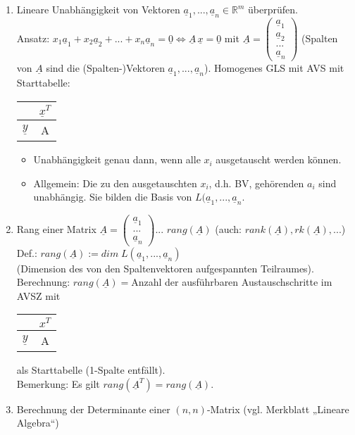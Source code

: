 \begin{enumerate}
\item Lineare Unabhängigkeit von Vektoren $\underline{a}_1,..., \underline{a}_n \in \mathbb{R}^m$ überprüfen.\\
Ansatz: $\boxed{x_1\underline{a}_1+x_2 \underline{a}_2+...+x_n\underline{a}_n=\underline{0}}\Leftrightarrow \boxed{\underline{A}\,\underline{x}=\underline{0}}$ mit $\underline{A}=\begin{pmatrix}
\underline{a}_1\\
\underline{a}_2\\
...\\
\underline{a}_n
\end{pmatrix}$ (Spalten von $\underline{A}$ sind die (Spalten-)Vektoren $\underline{a}_1,...,\underline{a}_n$). Homogenes GLS mit AVS mit Starttabelle: \begin{tabular}{c | c}
& $\underline{x}^T$\\
\hline
$\underline{y}$& A
\end{tabular}
\begin{itemize}
\item Unabhängigkeit genau dann, wenn alle $x_i$ ausgetauscht werden können.
\item Allgemein: Die zu den ausgetauschten $x_i$, d.h. BV, gehörenden $a_i$ sind unabhängig. Sie bilden die Basis von $L(\underline{a}_1,...,\underline{a}_n$.
\end{itemize}
\item Rang einer Matrix $\underline{A}=\begin{pmatrix}
\underline{a}_1\\
...\\
\underline{a}_n
\end{pmatrix}$... $rang(\underline{A})$ (auch: $rank(\underline{A}), rk(\underline{A}),...$)\\
Def.: $\boxed{rang(\underline{A}):=dim\; L(\underline{a}_1,...,\underline{a}_n)}$ \\
(Dimension des von den Spaltenvektoren aufgespannten Teilraumes).\\
Berechnung: $rang(\underline{A})=$Anzahl der ausführbaren Austauschschritte im AVSZ mit \begin{tabular}{r | c}
& $x^T$\\
\hline
$\underline{y}$& A
\end{tabular} als Starttabelle (1-Spalte entfällt).\\
Bemerkung: Es gilt $rang(\underline{A}^T)=rang(\underline{A})$.
\item Berechnung der Determinante einer $(n,n)$-Matrix (vgl. Merkblatt „Lineare Algebra“)
\end{enumerate}
